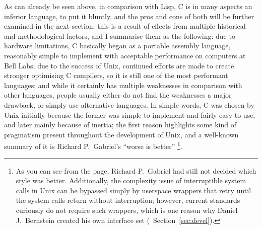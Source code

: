 As can already be seen above, in comparison with Lisp, C is in many aspects an
inferior language, to put it bluntly, and the pros and
cons of both will be further examined in the next section; this is a result of
effects from multiple historical and methodological factors, and I summarise
them as the following: due to hardware limitations, C basically began as a
portable assembly language, reasonably simple to implement with acceptable
performance on computers at Bell Labs; due to the success of Unix, continued
efforts are made to create stronger optimising C compilers, so it is still one
of the most performant languages; and while it certainly has multiple weaknesses
in comparison with other languages, people usually either do not find the
weaknesses a major drawback, or simply use alternative languages.  In simple
words, C was chosen by Unix initially because the former was simple to implement
and fairly easy to use, and later mainly because of inertia; the first reason
highlights some kind of pragmatism present throughout the development of Unix,
and a well-known summary of it is Richard P.\ Gabriel's ``worse is better''%
\footnote{As you can see from the page, Richard
P.\ Gabriel had still not decided which style was better.  Additionally,
the complexity issue of interruptible system calls in Unix can be bypassed
simply by userspace wrappers that retry until the system calls return without
interruption; however, current standards curiously do not require such
wrappers, which is one reason why Daniel J.\ Bernstein created
his own interface set (\cf~Section~\ref{sec:devel}).}.

